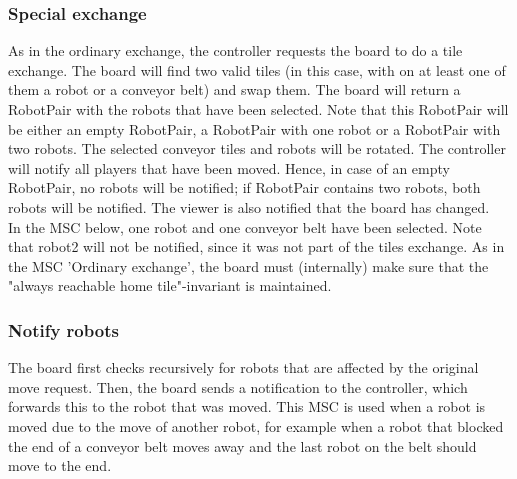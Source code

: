 	\subsubsection{Special exchange}
	\begin{minipage}{\linewidth}
		As in the ordinary exchange, the controller requests the board to do a tile exchange. The board will find two valid tiles (in this case, with on at least one of them a robot or a conveyor belt) and swap them. The board will return a RobotPair with the robots that have been selected. Note that this RobotPair will be either an empty RobotPair, a RobotPair with one robot or a RobotPair with two robots. The selected conveyor tiles and robots will be rotated. The controller will notify all players that have been moved. Hence, in case of an empty RobotPair, no robots will be notified; if RobotPair contains two robots, both robots will be notified. The viewer is also notified that the board has changed. \\
In the MSC below, one robot and one conveyor belt have been selected. Note that robot2 will not be notified, since it was not part of the tiles exchange. As in the MSC 'Ordinary exchange', the board must (internally) make sure that the "always reachable home tile"-invariant is maintained.

		
	\end{minipage}	

	\subsubsection{Notify robots}
	\begin{minipage}{\linewidth}
		The board first checks recursively for robots that are affected by the original move request. Then, the board sends a notification to the controller, which forwards this to the robot that was moved. This MSC is used when a robot is moved due to the move of another robot, for example when a robot that blocked the end of a conveyor belt moves away and the last robot on the belt should move to the end.

		
	\end{minipage}

